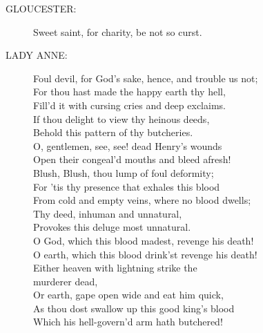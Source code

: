 \documentclass{article}
\begin{document}
\begin{description}
\item[GLOUCESTER:] 
\hspace{1pt}Sweet saint, for charity, be not so curst.\\
\end{description}
\begin{description}
\item[LADY ANNE:] 
\hspace{1pt}Foul devil, for God's sake, hence, and trouble us not;\\
\hspace{1pt}For thou hast made the happy earth thy hell,\\
\hspace{1pt}Fill'd it with cursing cries and deep exclaims.\\
\hspace{1pt}If thou delight to view thy heinous deeds,\\
\hspace{1pt}Behold this pattern of thy butcheries.\\
\hspace{1pt}O, gentlemen, see, see! dead Henry's wounds\\
\hspace{1pt}Open their congeal'd mouths and bleed afresh!\\
\hspace{1pt}Blush, Blush, thou lump of foul deformity;\\
\hspace{1pt}For 'tis thy presence that exhales this blood\\
\hspace{1pt}From cold and empty veins, where no blood dwells;\\
\hspace{1pt}Thy deed, inhuman and unnatural,\\
\hspace{1pt}Provokes this deluge most unnatural.\\
\hspace{1pt}O God, which this blood madest, revenge his death!\\
\hspace{1pt}O earth, which this blood drink'st revenge his death!\\
\hspace{1pt}Either heaven with lightning strike the\\
\hspace{1pt}murderer dead,\\
\hspace{1pt}Or earth, gape open wide and eat him quick,\\
\hspace{1pt}As thou dost swallow up this good king's blood\\
\hspace{1pt}Which his hell-govern'd arm hath butchered!\\
\end{description}
\end{document}

